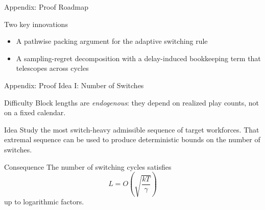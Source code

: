 \documentclass[10pt,aspectratio=169]{beamer}
\newcommand{\Regret}{\operatorname{Regret}}
\begin{document}
\begin{frame}{Appendix: Proof Roadmap}
\begin{center}
\end{center}

\vspace{0.7em}
\begin{block}{Two key innovations}
\begin{itemize}
    \item A pathwise packing argument for the adaptive switching rule
    \item A sampling-regret decomposition with a delay-induced bookkeeping term that telescopes across cycles
\end{itemize}
\end{block}
\end{frame}

\begin{frame}[t]{Appendix: Proof Idea I: Number of Switches}
\begin{block}{Difficulty}
Block lengths are \emph{endogenous}: they depend on realized play counts, not on a fixed calendar.
\end{block}

\begin{block}{Idea}
Study the most switch-heavy admissible sequence of target workforces. That extremal sequence can be used to produce deterministic bounds on the number of switches.
\end{block}

\begin{alertblock}{Consequence}
The number of switching cycles satisfies
\[
L=O\!\left(\sqrt{\frac{kT}{\gamma}}\right)
\]
up to logarithmic factors.
\end{alertblock}
\end{frame}
\end{document}
